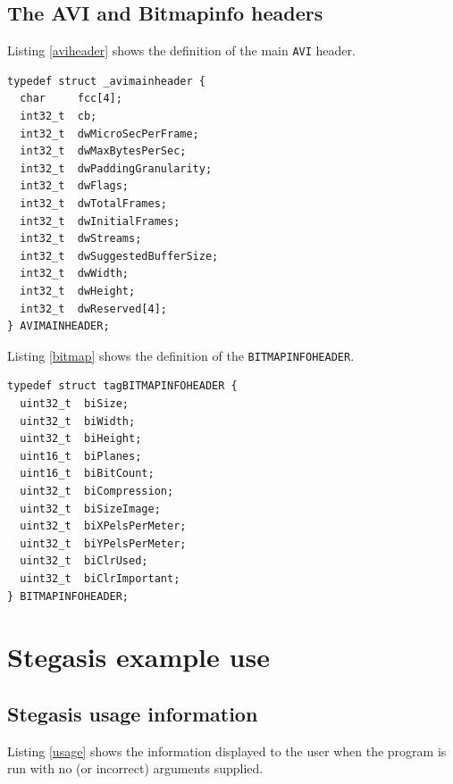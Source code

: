 \documentclass[paper=a4, fontsize=11pt,twoside]{scrartcl}
\numberwithin{table}{section}
\numberwithin{figure}{section}
\numberwithin{algorithm}{section}
\begin{document}
\vfill
\pagebreak

\subsection{The AVI and Bitmapinfo headers}

Listing \ref{aviheader} shows the definition of the main \texttt{AVI} header.

\begin{lstlisting}[caption={The \texttt{AVIMAINHEADER} structure.},frame=single, upquote=true,label=aviheader,showstringspaces=false]
typedef struct _avimainheader {
  char     fcc[4];
  int32_t  cb;
  int32_t  dwMicroSecPerFrame;
  int32_t  dwMaxBytesPerSec;
  int32_t  dwPaddingGranularity;
  int32_t  dwFlags;
  int32_t  dwTotalFrames;
  int32_t  dwInitialFrames;
  int32_t  dwStreams;
  int32_t  dwSuggestedBufferSize;
  int32_t  dwWidth;
  int32_t  dwHeight;
  int32_t  dwReserved[4];
} AVIMAINHEADER;
\end{lstlisting}

Listing \ref{bitmap} shows the definition of the \texttt{BITMAPINFOHEADER}.

\begin{lstlisting}[caption={The \texttt{BITMAPINFOHEADER} structure.},frame=single, upquote=true,label=bitmap,showstringspaces=false]
typedef struct tagBITMAPINFOHEADER {
  uint32_t  biSize;
  uint32_t  biWidth;
  uint32_t  biHeight;
  uint16_t  biPlanes;
  uint16_t  biBitCount;
  uint32_t  biCompression;
  uint32_t  biSizeImage;
  uint32_t  biXPelsPerMeter;
  uint32_t  biYPelsPerMeter;
  uint32_t  biClrUsed;
  uint32_t  biClrImportant;
} BITMAPINFOHEADER;
\end{lstlisting}

\vfill
\pagebreak

\section{Stegasis example use} 
\label{app:steg}

\subsection{Stegasis usage information}

Listing \ref{usage} shows the information displayed to the user when the program is run with no (or incorrect) arguments supplied.
\end{document}
